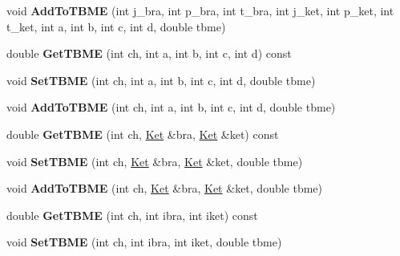 \begin{DoxyCompactItemize}
\item 
\hypertarget{classOperator_a1eab08cab486be5f69b2b06f834223fb}{void {\bfseries Add\-To\-T\-B\-M\-E} (int j\-\_\-bra, int p\-\_\-bra, int t\-\_\-bra, int j\-\_\-ket, int p\-\_\-ket, int t\-\_\-ket, int a, int b, int c, int d, double tbme)}\label{classOperator_a1eab08cab486be5f69b2b06f834223fb}

\item 
\hypertarget{classOperator_a7b02456755077e907395f4cc39b14e9e}{double {\bfseries Get\-T\-B\-M\-E} (int ch, int a, int b, int c, int d) const }\label{classOperator_a7b02456755077e907395f4cc39b14e9e}

\item 
\hypertarget{classOperator_a9fed52f338b7f30e3e3864412a3dbc16}{void {\bfseries Set\-T\-B\-M\-E} (int ch, int a, int b, int c, int d, double tbme)}\label{classOperator_a9fed52f338b7f30e3e3864412a3dbc16}

\item 
\hypertarget{classOperator_acf4d28b6e08bbc79cb126539500c85cd}{void {\bfseries Add\-To\-T\-B\-M\-E} (int ch, int a, int b, int c, int d, double tbme)}\label{classOperator_acf4d28b6e08bbc79cb126539500c85cd}

\item 
\hypertarget{classOperator_ab634a3d71b2dd9a84be4566ec392e062}{double {\bfseries Get\-T\-B\-M\-E} (int ch, \hyperlink{classKet}{Ket} \&bra, \hyperlink{classKet}{Ket} \&ket) const }\label{classOperator_ab634a3d71b2dd9a84be4566ec392e062}

\item 
\hypertarget{classOperator_a5570a3e70d684c90b6f5f46801440a21}{void {\bfseries Set\-T\-B\-M\-E} (int ch, \hyperlink{classKet}{Ket} \&bra, \hyperlink{classKet}{Ket} \&ket, double tbme)}\label{classOperator_a5570a3e70d684c90b6f5f46801440a21}

\item 
\hypertarget{classOperator_a1e529dc5c5fa5e2be3c33ab6ee0fdeaa}{void {\bfseries Add\-To\-T\-B\-M\-E} (int ch, \hyperlink{classKet}{Ket} \&bra, \hyperlink{classKet}{Ket} \&ket, double tbme)}\label{classOperator_a1e529dc5c5fa5e2be3c33ab6ee0fdeaa}

\item 
\hypertarget{classOperator_ab5634a69a698cce1bb15dbc05eaf310c}{double {\bfseries Get\-T\-B\-M\-E} (int ch, int ibra, int iket) const }\label{classOperator_ab5634a69a698cce1bb15dbc05eaf310c}

\item 
\hypertarget{classOperator_ab77691d8e014655fde0731f0112aacf8}{void {\bfseries Set\-T\-B\-M\-E} (int ch, int ibra, int iket, double tbme)}\label{classOperator_ab77691d8e014655fde0731f0112aacf8}


\end{DoxyCompactItemize}
